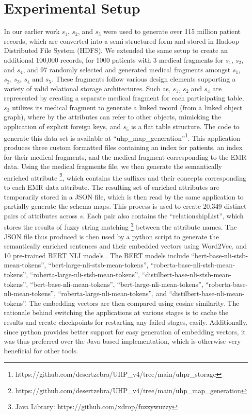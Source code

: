 \documentclass{ieeeaccess}
\begin{document}
\section{Experimental Setup}
\label{experimentalSetup}
In our earlier work \cite{Satti2020} $s_1$, $s_2$, and $s_5$ were used to generate over 115 million patient records, which are converted into a semi-structured form and stored in Hadoop Distributed File System (HDFS). We extended the same setup to create an additional 100,000 records, for 1000 patients with 3 medical fragments for $s_1$, $s_2$, and $s_4$, and 97 randomly selected and generated medical fragments amongst $s_1$, $s_2$, $s_3$, $s_4$ and $s_5$. These fragments follow various design elements supporting a variety of valid relational storage architectures. Such as, $s_1$, $s_2$ and $s_4$ are represented by creating a separate medical fragment for each participating table, $s_3$ utilizes its medical fragment to generate a linked record (from a linked object graph), where by the attributes can refer to other objects, mimicking the application of explicit foreign keys, and $s_5$ is a flat table structure. The code to generate this data set is available at ``uhp\_map\_generation''\footnote{https://github.com/desertzebra/UHP\_v4/tree/main/uhpr\_storage}. This application produces three custom formatted files containing an index for patients, an index for their medical fragments, and the medical fragment corresponding to the EMR data. Using the medical fragments file, we then generate the semantically enriched attribute \footnote{https://github.com/desertzebra/UHP\_v4/tree/main/uhp\_map\_generation}, which contains the suffixes and their concepts corresponding to each EMR data attribute. The resulting set of enriched attributes are temporarily stored in a JSON file, which is then read by the same application to partially generate the schema maps. This process is used to create 20,349 distinct pairs of attributes across $s$. Each pair also contains the ``relationshipList'', which stores the results of fuzzy string matching\cite{FuzzyWuzzy} \footnote{Java Library: https://github.com/xdrop/fuzzywuzzy} between the attribute names. 
The JSON file thus produced is then used by a python script to generate the semantically enriched sentences and their embedded vectors using Word2Vec, and 10 pre-trained BERT NLI models \cite{reimers-2019-sentence-bert}. The BERT models include ``bert-base-nli-stsb-mean-tokens'', ``bert-large-nli-stsb-mean-tokens'', ``roberta-base-nli-stsb-mean-tokens'', ``roberta-large-nli-stsb-mean-tokens'', ``distilbert-base-nli-stsb-mean-tokens'', ``bert-base-nli-mean-tokens'', ``bert-large-nli-mean-tokens'', ``roberta-base-nli-mean-tokens'', ``roberta-large-nli-mean-tokens'', and ``distilbert-base-nli-mean-tokens''. 
The embedding vectors are then compared using cosine similarity. The rationale behind switching the applications at various stages is to cache the results and create checkpoints for restarting any failed stages, easily. Additionally, since python provides better support for easy generation of embedding vectors, it was thus preferred over the Java based implementation, which is otherwise very beneficial for other tools.
\end{document}
